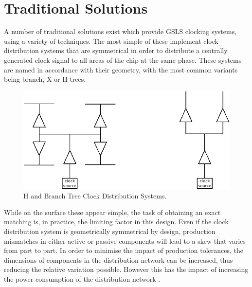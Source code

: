 \section{Traditional Solutions}
A number of traditional solutions exist which provide \ac{GSLS} clocking systems, using a variety of techniques. The most simple of these implement clock distribution systems that are symmetrical in order to distribute a centrally generated clock signal to all areas of the chip at the same phase. These systems are named in accordance with their geometry, with the most common variants being branch, X or H trees. 
\begin{figure}[h]
	\centering
	\includegraphics[scale=0.33]{../trees}
	\caption{H and Branch Tree Clock Distribution Systems.}
	\label{fig:trees}
\end{figure}

While on the surface these appear simple, the task of obtaining an exact matching is, in practice, the limiting factor in this design. Even if the clock distribution system is geometrically symmetrical by design, production mismatches in either active or passive components will lead to a skew that varies from part to part. In order to minimise the impact of production tolerances, the dimensions of components in the distribution network can be increased, thus reducing the relative variation possible. However this has the impact of increasing the power consumption of the distribution network \cite{tiwari1998reducing}.

